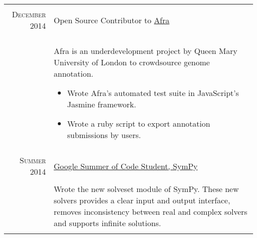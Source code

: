 \documentclass[a4paper,10pt]{article}
\begin{document}
\begin{samepage}
\begin{tabular}{r|p{12cm}}
\\\multicolumn{2}{c}{} \\




    \textsc{December 2014} & Open Source Contributor to \href{http://afra.sbcs.qmul.ac.uk/}{Afra}
        \emph{}\\& \\&
        Afra is an underdevelopment project by Queen Mary
    University of London to crowdsource genome annotation.
\begin{itemize}
        \item Wrote Afra's automated test suite in JavaScript's Jasmine
            framework.
        \item Wrote a ruby script to export annotation submissions by users.
\end{itemize}\\\multicolumn{2}{c}{} \\




\textsc{Summer 2014} &
\href{https://github.com/sympy/sympy/wiki/GSoC-2014-Application-Harsh-Gupta:-Solvers}{Google
Summer of Code Student, SymPy}
\emph{}\\& \\&
Wrote the new solveset module of SymPy. These new
solvers provides a clear input and output interface, removes inconsistency
between real and complex solvers and supports infinite solutions.\\\multicolumn{2}{c}{} \\

%
%
\end{tabular}

\end{samepage}
\end{document}
